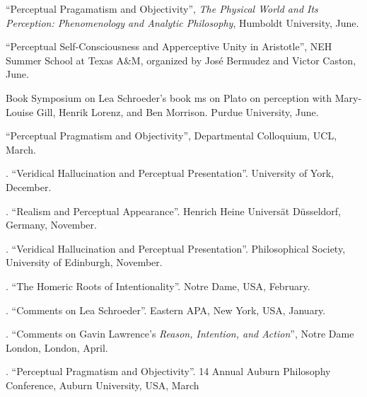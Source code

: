 \documentclass[11pt]{article}
\begin{document}

 \bigskip

\medskip

 ``Perceptual Pragamatism and Objectivity'', \emph{The Physical World and Its Perception: Phenomenology and Analytic Philosophy}, Humboldt University, June.

 ``Perceptual Self-Consciousness and Apperceptive Unity in Aristotle'', NEH Summer School at Texas A\&M, organized by José Bermudez and Victor Caston, June.

 Book Symposium on Lea Schroeder's book ms on Plato on perception with Mary-Louise Gill, Henrik Lorenz, and Ben Morrison. Purdue University, June.

 ``Perceptual Pragmatism and Objectivity'', Departmental Colloquium, UCL, March.

. ``Veridical Hallucination and Perceptual Presentation''. University of York, December.

. ``Realism and Perceptual Appearance''. Henrich Heine Universät Düsseldorf, Germany, November.

. ``Veridical Hallucination and Perceptual Presentation''. Philosophical Society, University of Edinburgh, November.

. ``The Homeric Roots of Intentionality''. Notre Dame, USA, February.

. ``Comments on Lea Schroeder''. Eastern APA, New York, USA, January.

. ``Comments on Gavin Lawrence's \emph{Reason, Intention, and Action}'', Notre Dame London, London, April.

. ``Perceptual Pragmatism and Objectivity''. 14 Annual Auburn Philosophy Conference, Auburn University, USA, March
\end{document}
